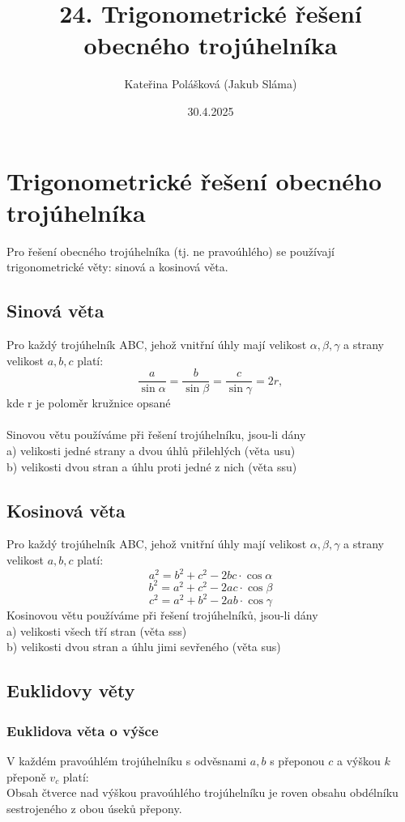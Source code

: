 \title{24. Trigonometrické řešení obecného trojúhelníka}
\author{Kateřina Polášková (Jakub Sláma)}
\date{30.4.2025}

\maketitle

\section{Trigonometrické řešení obecného trojúhelníka}
Pro řešení obecného trojúhelníka (tj. ne pravoúhlého) se používají trigonometrické věty: sinová a kosinová věta.
\subsection{Sinová věta}
Pro každý trojúhelník ABC, jehož vnitřní úhly mají velikost $\alpha, \beta, \gamma$ a strany velikost $a, b, c$ platí:
$$
    \frac{a}{\sin \alpha} = \frac{b}{\sin \beta} = \frac{c}{\sin \gamma} = 2r,
$$
kde r je poloměr kružnice opsané
\\ 
\\
Sinovou větu používáme při řešení trojúhelníku, jsou-li dány \\
a) velikosti jedné strany a dvou úhlů přilehlých (věta usu) \\
b) velikosti dvou stran a úhlu proti jedné z nich (věta ssu)
\subsection{Kosinová věta}
Pro každý trojúhelník ABC, jehož vnitřní úhly mají velikost $\alpha, \beta, \gamma$ a strany velikost $a, b, c$ platí:
$$
    a^2 = b^2 + c^2 - 2bc \cdot \cos\alpha
$$
$$
    b^2 = a^2 + c^2 - 2ac \cdot \cos\beta
$$
$$
    c^2 = a^2 + b^2 - 2ab \cdot \cos\gamma
$$
Kosinovou větu používáme při řešení trojúhelníků, jsou-li dány 
\\
a) velikosti všech tří stran (věta sss)\\
b) velikosti dvou stran a úhlu jimi sevřeného (věta sus)

\subsection{Euklidovy věty}  
\subsubsection{Euklidova věta o výšce}
V každém pravoúhlém trojúhelníku s odvěsnami $a, b$ s přeponou $c$ a výškou $k$ přeponě $v_c$ platí:\\
Obsah čtverce nad výškou pravoúhlého trojúhelníku je roven obsahu obdélníku sestrojeného z obou úseků přepony.

